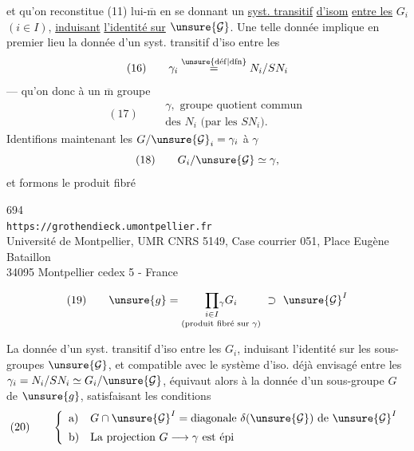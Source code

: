 \noindent {}\quad
{}

et qu'on reconstitue (11) lui-$\overline{\mathrm m}$ en se donnant un \uline{syst. transitif} \uline{d'isom} \uline{entre les} $G_i$ $(i\in I)$, \uline{induisant} \uline{l'identité sur} $\unsure{\mathcal G}$. Une telle donnée implique en premier lieu la donnée d'un syst. transitif d'iso entre les
\[
(16)\qquad 
\gamma_i\overset{\unsure{\mathrm{d\acute ef}|\mathrm{dfn}}}{=}N_i/SN_i
\]
--- qu'on  donc à un $\overline{\mathrm m}$ groupe
\[
(17)\qquad 
\begin{gathered}
\gamma,\text{ groupe quotient commun}\\
\text{des }N_i\text{ (par les }SN_i\text{).}
\end{gathered}
\]
Identifions maintenant les $G/\unsure{\mathcal G}_i=\gamma_i$ à $\gamma$
\[
(18)\qquad G_i/\unsure{\mathcal G}\simeq\gamma,
\]
et formons le produit fibré


\begin{center}
694\\
\texttt{https://grothendieck.umontpellier.fr}\\
Université de Montpellier, UMR CNRS 5149, Case courrier 051, Place Eugène Bataillon\\
34095 Montpellier cedex 5 - France
\end{center}



\[
(19)\qquad 
\unsure{g}=\underset{\text{(produit fibré sur }\gamma\text{)}}{\prod_{i\in I}\!{}_{\gamma}G_i}\ \supset\ \unsure{\mathcal G}^I
\]

La donnée d'un syst. transitif d'iso entre les $G_i$, induisant l'identité sur les sous-groupes $\unsure{\mathcal G}$, et compatible avec le système   d'iso. déjà envisagé entre les $\gamma_i=N_i/SN_i\simeq G_i/\unsure{\mathcal G}$, équivaut alors à la donnée d'un sous-groupe $G$ de $\unsure{g}$, satisfaisant les conditions
\[
(20)\qquad 
\left\{\begin{array}{ll}
\text{a)}&G\cap\unsure{\mathcal G}^I=\text{diagonale }\delta(\unsure{\mathcal G})\text{ de }\unsure{\mathcal G}^I\\[5pt]
\text{b)}&\text{La projection }G\longrightarrow\gamma\text{ est épi}
\end{array}\right.
\]


